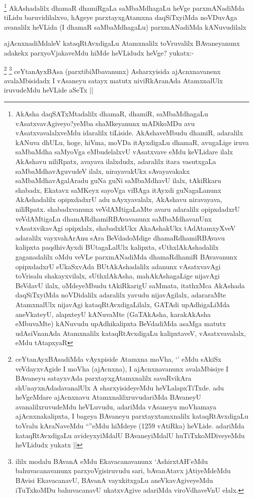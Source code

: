 \begin{artha}
\footnote{AkAsha daqSATxMtadalilx dhamaR, dhamiR, saMbaMdhagaLu vAsatxvavAgiveyo?yeMba shaMkeyanunx mADikoMDu avu vAsatxvavalalxveMdu idaralilx tiLiside. AkAshaveMbudu dhamiR, adaralilx kANuva dhULu, hoge, hiVma, moVDa itAyxdigaLu dhamaR, avugaLige iruva saMbaMdha saMyoVga eMbudelalxvU vAsatxvave eMdu keVLidare ilalx AkAshavu niliRpatx, avayava ilalxdudx, adaralilx itara vasutxgaLa saMbaMdhavAguvudeV ilalx, nirayavakUkx sAvayavakakx saMbaMdhavAgalAradu guNa guNi saMbaMdhavU ilalx, tAkiRkaru shabadx, Ekatavx saMKeyx sayoVga viBAga itAyxdi guNagaLanunx AkAshadalilx opipxdadxrU adu nAyxyavalalx, AkAshavu niravayava, niliRpatx. shabadxvanunx veVdAMtigaLaMte avaru adaralilx opipxdadxrU veVdAMtigaLu dhamARdhamiRBAvavanunx saMbaMdhavanUnx vAsatxvikavAgi opipxlalx, shabadxkUkx AkaAshakUkx tAdAtamxyXveV adaralilx vayxvahArAnu sAra BeVdadoMdige dhamaRdhamiRBAvavu kalipxta paqdhivAyxdi BUtagaLalUlx kalipxta, sUthxlAkAshadalilx gaganadalilx oMdu veVLe parxmANadiMda dhamaRdhamiR BAvavanunx opipxdadxrU sUkaSxvAda BUtAkAshadalilx adanunx vAsatxvavAgi toVrisalu shakayxvilalx, sUthxlAkAsha, mahAkAshagaLige nijavAgi BeVdavU ilalx, oMdeyeMbudu tAkiRkarigU saMmata, itathxMca AkAshada daqSiTxyiMda noVDidalilx adaralilx yavudu nijavAgilalx, adararaMte AtamxnalUlx nijavAgi kataqRtAvxdigaLilalx, GATAdi upAdhigaLiMda aneVkateyU, alapxteyU kANuvaMte (GaTAkAsha, karakAkAsha eMbuvaMte) kANuvudu upAdhikalipxta BeVdadiMda asaMga matutx udAsiVnanAda Atamxnalilx kataqRtAvxdigaLu kalipxtaveV, vAsatxvavalalx, eMdu tAtapxyaR }
AkAshadalilx dhamaR dhamiRgaLa saMbaMdhagaLu heVge parxmANadiMda tiLidu baruvidilalxvo, hAgeye parxtayxgAtamxna daqSiTxyiMda noVDuvAga avanalilx heVLida (I dhamaR saMbaMdhagaLu) parxmANadiMda kANuvudilalx
\end{artha}

\begin{artha}
ajAcnxnadiMdaleV kataqRtAvxdigaLu Atamxnalilx toVruvalilx BAvaneyanunx adakekx parxyoVjakaveMdu hiMde heVLidudx heVge? yukatx:-
\end{artha}

\begin{artha}
\footnote{ceYtanAyxBAsadiMda vAyxpiside Atamxna moVha, `\stext' eMdu sAkiSx veVdayxvAgide I moVha (ajAcnxna), I ajAcnxnavanunx avalaMbisiye I BAvaneyu satayxvAda parxtayxgAtamxnalilx savaRvikAra shUnayxnAdadavanalUlx A sharxyisideyeMdu heVLalapxTiTxde. adu heVgeMdare ajAcnxnavu AtamxnalilxruvudariMda BAvaneyU avanalilxruvudeMdu heVLuvudu, adariMda vAsaneyu moVhamaya ajAcnxnakalipxta, I bageya BAvaneyu parxtayxtamxnalilx kataqRtAvxdigaLu toVralu kAraNaveMdu ``\stext''eMdu hiMdeye (1259 vAtiRka) heVLide. adariMda kataqRtAvxdigaLu avideyxyiMdalU BAvaneyiMdalU huTiTxkoMDiveyeMdu heVLidudx yukatx ||}
\footnote{ililx modalu BAvanA eMdu Ekavacanavanunx `AshirxtAH'eMdu bahuvacanavanunx parxyoVgisiruvudu sari, bAvanAtavx jAtiyeMdeMdu BAvisi EkavacanavU, BAvanA vayxkitxgaLu aneVkavAgiveyeMdu iTuTxkoMDu bahuvacanavU ukatxvAgive adariMda viroVdhaveVnU elalx.}
ceYtanAyxBAsa (parxtibiMbavanunx) Asharxyisida ajAcnxnavanenx avalaMbisidadx I vAsaneyu satayx matutx niviRkAranAda AtamxnalUlx iruvudeMdu heVLide aSeTx ||
\end{artha}

